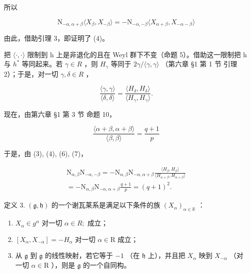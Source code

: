 所以

\[
\mathrm{N} _ {- \alpha , \alpha + \beta} \langle X _ {\beta}, X _ {- \beta} \rangle = - \mathrm{N} _ {- \alpha , - \beta} \langle X _ {\alpha + \beta}, X _ {- \alpha - \beta} \rangle
\]

由此，借助引理 3，即证明了 (4)。

把 \(\langle\cdot,\cdot\rangle\) 限制到 h 上是非退化的且在 Weyl 群下不变（命题 5）。借助这一限制把 h 与 \(h^{*}\) 等同起来。若 \(\gamma\in R\) ，则 \(H_{\gamma}\) 等同于 \(2\gamma/\langle\gamma,\gamma\rangle\) （第六章 §1 第 1 节 引理 2）；于是，对一切 \(\gamma,\delta\in R\) ，

\[
\frac {\langle \gamma , \gamma \rangle}{\langle \delta , \delta \rangle} = \frac {\langle H _ {\delta} , H _ {\delta} \rangle}{\langle H _ {\gamma} , H _ {\gamma} \rangle}.\tag{6}
\]

现在，由第六章 §1 第 3 节 命题 10，

\[
\frac {\langle \alpha + \beta , \alpha + \beta \rangle}{\langle \beta , \beta \rangle} = \frac {q + 1}{p}\tag{7}
\]

于是，由 (3), (4), (6), (7)，

\[
\begin{array}{r} \mathrm{N} _ {\alpha , \beta} \mathrm{N} _ {- \alpha , - \beta} = - \mathrm{N} _ {\alpha , \beta} \mathrm{N} _ {- \alpha , \alpha + \beta} \frac {\langle H _ {\beta} , H _ {\beta} \rangle}{\langle H _ {\alpha + \beta} , H _ {\alpha + \beta} \rangle} \\ = - \mathrm{N} _ {\alpha , \beta} \mathrm{N} _ {- \alpha , \alpha + \beta} \frac {q + 1}{p} = (q + 1) ^ {2}. \end{array}
\]

定义 3. \((\mathfrak{g},\mathfrak{h})\) 的一个谢瓦莱系是满足以下条件的族 \((X_{\alpha})_{\alpha \in \mathbb{R}}\) ：

\begin{enumerate}
\def\labelenumi{(\roman{enumi})}
\item
  \(X_{\alpha} \in g^{\alpha}\) 对一切 \(\alpha \in R;\) 成立；
\item
  \([X_{\alpha}, X_{-\alpha}] = -H_{\alpha}\) 对一切 \(\alpha \in \mathrm{R}\) 成立；
\item
  从 \(\mathfrak{g}\) 到 \(\mathfrak{g}\) 的线性映射，若它等于 \(-1\) （在 \(\mathfrak{h}\) 上），并且把 \(X_{\alpha}\) 映到 \(X_{-\alpha}\) （对一切 \(\alpha \in \mathrm{R}\) ），则是 \(\mathfrak{g}\) 的一个自同构。
\end{enumerate}

